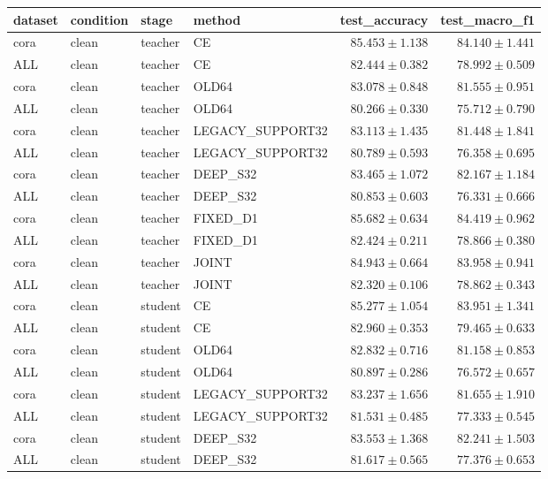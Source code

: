 \begin{longtable}{llllrr}
dataset & condition & stage & method & test\_accuracy & test\_macro\_f1 \\
\hline
cora & clean & teacher & CE & $85.453 \pm 1.138$ & $84.140 \pm 1.441$ \\
ALL & clean & teacher & CE & $82.444 \pm 0.382$ & $78.992 \pm 0.509$ \\
cora & clean & teacher & OLD64 & $83.078 \pm 0.848$ & $81.555 \pm 0.951$ \\
ALL & clean & teacher & OLD64 & $80.266 \pm 0.330$ & $75.712 \pm 0.790$ \\
cora & clean & teacher & LEGACY\_SUPPORT32 & $83.113 \pm 1.435$ & $81.448 \pm 1.841$ \\
ALL & clean & teacher & LEGACY\_SUPPORT32 & $80.789 \pm 0.593$ & $76.358 \pm 0.695$ \\
cora & clean & teacher & DEEP\_S32 & $83.465 \pm 1.072$ & $82.167 \pm 1.184$ \\
ALL & clean & teacher & DEEP\_S32 & $80.853 \pm 0.603$ & $76.331 \pm 0.666$ \\
cora & clean & teacher & FIXED\_D1 & $85.682 \pm 0.634$ & $84.419 \pm 0.962$ \\
ALL & clean & teacher & FIXED\_D1 & $82.424 \pm 0.211$ & $78.866 \pm 0.380$ \\
cora & clean & teacher & JOINT & $84.943 \pm 0.664$ & $83.958 \pm 0.941$ \\
ALL & clean & teacher & JOINT & $82.320 \pm 0.106$ & $78.862 \pm 0.343$ \\
cora & clean & student & CE & $85.277 \pm 1.054$ & $83.951 \pm 1.341$ \\
ALL & clean & student & CE & $82.960 \pm 0.353$ & $79.465 \pm 0.633$ \\
cora & clean & student & OLD64 & $82.832 \pm 0.716$ & $81.158 \pm 0.853$ \\
ALL & clean & student & OLD64 & $80.897 \pm 0.286$ & $76.572 \pm 0.657$ \\
cora & clean & student & LEGACY\_SUPPORT32 & $83.237 \pm 1.656$ & $81.655 \pm 1.910$ \\
ALL & clean & student & LEGACY\_SUPPORT32 & $81.531 \pm 0.485$ & $77.333 \pm 0.545$ \\
cora & clean & student & DEEP\_S32 & $83.553 \pm 1.368$ & $82.241 \pm 1.503$ \\
ALL & clean & student & DEEP\_S32 & $81.617 \pm 0.565$ & $77.376 \pm 0.653$ \\

\end{longtable}
